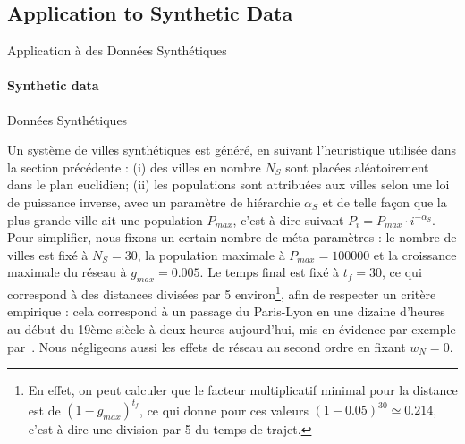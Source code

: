 \subsection{Application to Synthetic Data}{Application à des Données Synthétiques}




\paragraph{Synthetic data}{Données Synthétiques}


Un système de villes synthétiques est généré, en suivant l'heuristique utilisée dans la section précédente : (i) des villes en nombre $N_S$ sont placées aléatoirement dans le plan euclidien; (ii) les populations sont attribuées aux villes selon une loi de puissance inverse, avec un paramètre de hiérarchie $\alpha_S$ et de telle façon que la plus grande ville ait une population $P_{max}$, c'est-à-dire suivant $P_i = P_{max} \cdot i^{-\alpha_S}$. Pour simplifier, nous fixons un certain nombre de méta-paramètres : le nombre de villes est fixé à $N_S = 30$, la population maximale à $P_{max} = 100000$ et la croissance maximale du réseau à $g_{max} = 0.005$. Le temps final est fixé à $t_f = 30$, ce qui correspond à des distances divisées par 5 environ\footnote{En effet, on peut calculer que le facteur multiplicatif minimal pour la distance est de $(1 - g_{max})^{t_f}$, ce qui donne pour ces valeurs $(1 - 0.05)^{30} \simeq 0.214$, c'est à dire une division par 5 du temps de trajet.}, afin de respecter un critère empirique : cela correspond à un passage du Paris-Lyon en une dizaine d'heures au début du 19ème siècle à deux heures aujourd'hui, mis en évidence par exemple par~\cite{thevenin2013mapping}. Nous négligeons aussi les effets de réseau au second ordre en fixant $w_N = 0$.


